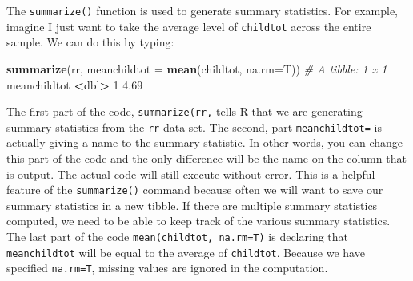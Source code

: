 \documentclass[
]{book}
\newenvironment{Shaded}{\begin{snugshade}}{\end{snugshade}}
\newcommand{\AttributeTok}[1]{\textcolor[rgb]{0.13,0.29,0.53}{#1}}
\newcommand{\CommentTok}[1]{\textcolor[rgb]{0.56,0.35,0.01}{\textit{#1}}}
\newcommand{\DecValTok}[1]{\textcolor[rgb]{0.00,0.00,0.81}{#1}}
\newcommand{\FloatTok}[1]{\textcolor[rgb]{0.00,0.00,0.81}{#1}}
\newcommand{\FunctionTok}[1]{\textcolor[rgb]{0.13,0.29,0.53}{\textbf{#1}}}
\newcommand{\NormalTok}[1]{#1}
\newcommand{\SpecialCharTok}[1]{\textcolor[rgb]{0.81,0.36,0.00}{\textbf{#1}}}
\begin{document}
\begin{Shaded}
\end{Shaded}

\begin{Shaded}
\end{Shaded}

The \texttt{summarize()} function is used to generate summary statistics. For example, imagine I just want to take the average level of \texttt{childtot} across the entire sample. We can do this by typing:

\begin{Shaded}
\begin{Highlighting}[]
\FunctionTok{summarize}\NormalTok{(rr, }\AttributeTok{meanchildtot =} \FunctionTok{mean}\NormalTok{(childtot, }\AttributeTok{na.rm=}\NormalTok{T))}
\CommentTok{\# A tibble: 1 x 1}
\NormalTok{  meanchildtot}
         \SpecialCharTok{\textless{}}\NormalTok{dbl}\SpecialCharTok{\textgreater{}}
\DecValTok{1}         \FloatTok{4.69}
\end{Highlighting}
\end{Shaded}

The first part of the code, \texttt{summarize(rr,} tells R that we are generating summary statistics from the \texttt{rr} data set. The second, part \texttt{meanchildtot=} is actually giving a name to the summary statistic. In other words, you can change this part of the code and the only difference will be the name on the column that is output. The actual code will still execute without error. This is a helpful feature of the \texttt{summarize()} command because often we will want to save our summary statistics in a new tibble. If there are multiple summary statistics computed, we need to be able to keep track of the various summary statistics. The last part of the code \texttt{mean(childtot,\ na.rm=T)} is declaring that \texttt{meanchildtot} will be equal to the average of \texttt{childtot}. Because we have specified \texttt{na.rm=T}, missing values are ignored in the computation.
\end{document}
